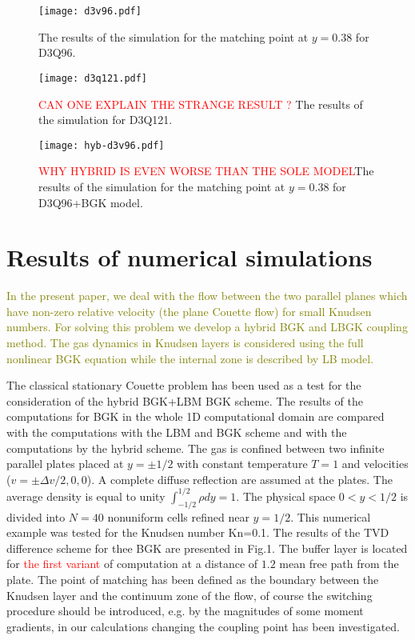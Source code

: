 \documentclass[]{elsarticle} %
\newcommand{\todo}[1]{\textcolor{olive}{#1}}
\begin{document}
{\begin{figure}[!h]
\centering
\texttt{[image: d3v96.pdf]}
\caption{The  results of the simulation for the matching point at $y=0.38$ for D3Q96.}
\end{figure}


\begin{figure}[!h]
\centering
\texttt{[image: d3q121.pdf]}
\caption{\textcolor{red}{CAN ONE EXPLAIN THE STRANGE RESULT ?} The  results of the simulation  for D3Q121.}
\end{figure}



\begin{figure}[!h]
\centering
\texttt{[image: hyb-d3v96.pdf]}
\caption{\textcolor{red}{WHY HYBRID IS EVEN WORSE THAN THE SOLE  MODEL}The  results of the simulation for the matching point at $y=0.38$ for D3Q96+BGK model.}
\end{figure}



\section{Results of numerical simulations}\label{sec:results}

\todo{In the present paper, we deal with the flow between the two parallel planes which have non-zero relative velocity (the plane Couette flow) for small Knudsen numbers. For solving this problem we develop a hybrid BGK and LBGK coupling method. The gas dynamics in Knudsen layers is considered using the full nonlinear BGK equation while the internal zone is described by LB model.}

The classical stationary Couette problem has been used as a test for the consideration of the hybrid BGK+LBM BGK scheme. The results of the computations for BGK in the whole 1D computational domain are compared with the computations with the LBM and BGK scheme and with the computations by the hybrid scheme. The gas is confined between two infinite parallel plates placed at $y = \pm 1/2$ with constant temperature $T = 1$ and velocities ($v = \pm\Delta v/2,0,0$). A complete diffuse reflection are assumed at the plates. The average density is equal to unity $\int_{-1/2}^{1/2}\rho dy=1$. The physical space $0 < y < 1/2$ is divided into $N = 40$ nonuniform cells refined near $y = 1/2$. This numerical example was tested for the Knudsen number Kn=0.1. The results of the TVD difference scheme for thee BGK  are presented in Fig.1. The buffer layer is located for \textcolor{red}{the first variant} of computation at a distance of $1.2$ mean free path from the plate. The point of matching has been defined as the boundary between the Knudsen layer and the continuum zone of the flow, of course the switching procedure should be introduced, e.g. by the magnitudes of some moment gradients, in our calculations changing the coupling point has been investigated.

}
\end{document}
